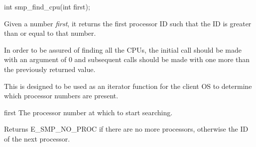 \begin{apisyn}

        \funcproto int smp_find_cpu(int first);
\end{apisyn}
\begin{apidesc}
	Given a number \emph{first}, it returns the first processor ID
	such that the ID is greater than or equal to that number.

	In order to be assured of finding all the CPUs,
	the initial call should be made with an argument of 0
	and subsequent calls should be made with one more than the
	previously returned value.

	This is designed to be used as an iterator function for
	the client OS to determine which processor numbers
	are present.
\end{apidesc}
\begin{apiparm}
        \item[first]
		The processor number at which to start searching.
\end{apiparm}
\begin{apiret}
	Returns E_SMP_NO_PROC if there are no more processors,
	otherwise the ID of the next processor.
\end{apiret}




